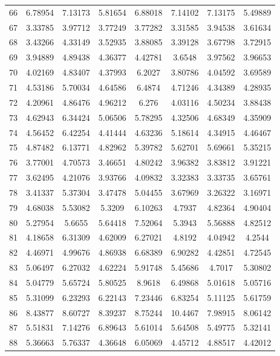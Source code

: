 \begin{figure}
\begin{tabular}{cccccccc}
66 & 6.78954 & 7.13173 & 5.81654 & 6.88018 & 7.14102 & 7.13175 & 5.49889\\
67 & 3.33785 & 3.97712 & 3.77249 & 3.77282 & 3.31585 & 3.94538 & 3.61634\\
68 & 3.43266 & 4.33149 & 3.52935 & 3.88085 & 3.39128 & 3.67798 & 3.72915\\
69 & 3.94889 & 4.89438 & 4.36377 & 4.42781 & 3.6548 & 3.97562 & 3.96653\\
70 & 4.02169 & 4.83407 & 4.37993 & 6.2027 & 3.80786 & 4.04592 & 3.69589\\
71 & 4.53186 & 5.70034 & 4.64586 & 6.4874 & 4.71246 & 4.34389 & 4.28935\\
72 & 4.20961 & 4.86476 & 4.96212 & 6.276 & 4.03116 & 4.50234 & 3.88438\\
73 & 4.62943 & 6.34424 & 5.06506 & 5.78295 & 4.32506 & 4.68349 & 4.35909\\
74 & 4.56452 & 6.42254 & 4.41444 & 4.63236 & 5.18614 & 4.34915 & 4.46467\\
75 & 4.87482 & 6.13771 & 4.82962 & 5.39782 & 5.62701 & 5.69661 & 5.35215\\
76 & 3.77001 & 4.70573 & 3.46651 & 4.80242 & 3.96382 & 3.83812 & 3.91221\\
77 & 3.62495 & 4.21076 & 3.93766 & 4.09832 & 3.32383 & 3.33735 & 3.65761\\
78 & 3.41337 & 5.37304 & 3.47478 & 5.04455 & 3.67969 & 3.26322 & 3.16971\\
79 & 4.68038 & 5.53082 & 5.3209 & 6.10263 & 4.7937 & 4.82364 & 4.90404\\
80 & 5.27954 & 5.6655 & 5.64418 & 7.52064 & 5.3943 & 5.56888 & 4.82512\\
81 & 4.18658 & 6.31309 & 4.62009 & 6.27021 & 4.8192 & 4.04942 & 4.2544\\
82 & 4.46971 & 4.99676 & 4.86938 & 6.68389 & 6.90282 & 4.42851 & 4.72545\\
83 & 5.06497 & 6.27032 & 4.62224 & 5.91748 & 5.45686 & 4.7017 & 5.30802\\
84 & 5.04779 & 5.65724 & 5.80525 & 8.9618 & 6.49868 & 5.01618 & 5.05716\\
85 & 5.31099 & 6.23293 & 6.22143 & 7.23446 & 6.83254 & 5.11125 & 5.61759\\
86 & 8.43877 & 8.60727 & 8.39237 & 8.75244 & 10.4467 & 7.98915 & 8.06142\\
87 & 5.51831 & 7.14276 & 6.89643 & 5.61014 & 5.64508 & 5.49775 & 5.32141\\
88 & 5.36663 & 5.76337 & 4.36648 & 6.05069 & 4.45712 & 4.88517 & 4.42012\\

\end{tabular}
\end{figure}
